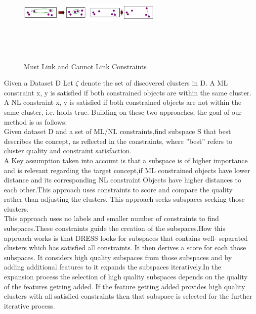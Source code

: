 \documentclass[10pt, conference, compsocconf]{IEEEtran}
\begin{document}
\begin{figure}[H]
\centering
\includegraphics[width=7cm,height=5cm,keepaspectratio]{both.PNG}
\caption{\label{fig:1-Dress Work flow} Must Link and Cannot Link Constraints}
\end{figure}

Given a Dataset D Let $\zeta$ denote the set of discovered clusters in D. A ML constraint {x, y} is satisfied if both constrained objects are within the same cluster.
A NL constraint {x, y} is satisfied if both constrained objects are not within the same cluster, i.e.  holds true. Building on these two approaches, the goal of our method is as follows:\\

Given dataset D and a set of ML/NL constraints,find subspace S that best describes the concept, as reflected in the constraints, where ”best” refers to cluster quality and constraint satisfaction.\\

A Key assumption taken into account is that a subspace is of higher importance and is relevant regarding the target concept,if ML constrained objects have lower distance and its corresponding NL constraint 
Objects have higher distances to each other.This approach uses constraints to score and compare the quality rather than adjusting the clusters. This approach seeks subspaces seeking those clusters.\\

This approach uses no labels and smaller number of constraints to find subspaces.These constraints guide the creation of the subspaces.How this approach works is that DRESS looks for subspaces that contains well-
separated clusters which has satisfied all constraints. It then derives a score for each those subspaces. It considers high quality subspaces from those subspaces and by adding additional features to it expands the subspaces iteratively.In the expansion process the selection of high quality subspaces depends on the quality of the features getting added. If the feature getting added provides high quality clusters with all satisfied constraints then that subspace is selected for the further iterative process.\\
\end{document}
